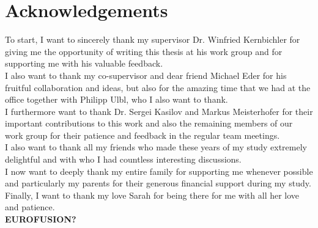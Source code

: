 \documentclass[./main.tex]{subfiles}
\begin{document}
\chapter*{Acknowledgements}
\label{cha:acknowledgements}
To start, I want to sincerely thank my supervisor Dr. Winfried Kernbichler for giving me the opportunity of writing this thesis at his work group and for supporting me with his valuable feedback. \\

I also want to thank my co-supervisor and dear friend Michael Eder for his fruitful collaboration and ideas, but also for the amazing time that we had at the office together with Philipp Ulbl, who I also want to thank.\\

I furthermore want to thank Dr. Sergei Kasilov and Markus Meisterhofer for their important contributions to this work and also the remaining members of our work group for their patience and feedback in the regular team meetings. \\

I also want to thank all my friends who made these years of my study extremely delightful and with who I had countless interesting discussions.
\\


I now want to deeply thank my entire family for supporting me whenever possible and particularly my parents for their generous financial support during my study. 
\\

Finally, I want to thank my love Sarah for being there for me with all her love and patience.\\


\textbf{EUROFUSION?}
\end{document}
